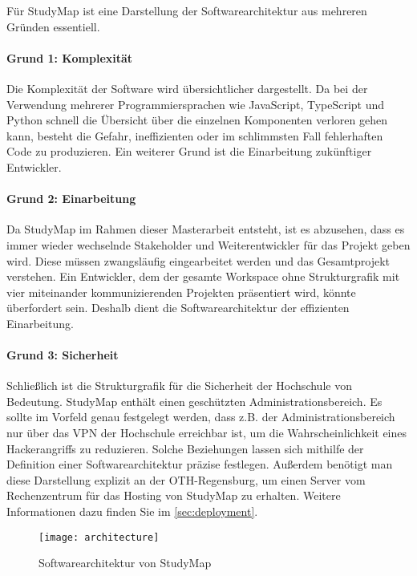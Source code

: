 Für StudyMap ist eine Darstellung der Softwarearchitektur aus mehreren Gründen essentiell.

\paragraph*{Grund 1: Komplexität}
Die Komplexität der Software wird übersichtlicher dargestellt. Da bei der Verwendung mehrerer Programmiersprachen wie JavaScript, TypeScript und Python schnell die Übersicht über die einzelnen Komponenten verloren gehen kann, besteht die Gefahr, ineffizienten oder im schlimmsten Fall fehlerhaften Code zu produzieren. Ein weiterer Grund ist die Einarbeitung zukünftiger Entwickler.

\paragraph*{Grund 2: Einarbeitung}
Da StudyMap im Rahmen dieser Masterarbeit entsteht, ist es abzusehen, dass es immer wieder wechselnde Stakeholder und Weiterentwickler für das Projekt geben wird. Diese müssen zwangsläufig eingearbeitet werden und das Gesamtprojekt verstehen. Ein Entwickler, dem der gesamte Workspace ohne Strukturgrafik mit vier miteinander kommunizierenden Projekten präsentiert wird, könnte überfordert sein. Deshalb dient die Softwarearchitektur der effizienten Einarbeitung.

\paragraph*{Grund 3: Sicherheit}
Schließlich ist die Strukturgrafik für die Sicherheit der Hochschule von Bedeutung. StudyMap enthält einen geschützten Administrationsbereich. Es sollte im Vorfeld genau festgelegt werden, dass z.B. der Administrationsbereich nur über das VPN der Hochschule erreichbar ist, um die Wahrscheinlichkeit eines Hackerangriffs zu reduzieren. Solche Beziehungen lassen sich mithilfe der Definition einer Softwarearchitektur präzise festlegen. Außerdem benötigt man diese Darstellung explizit an der OTH-Regensburg, um einen Server vom Rechenzentrum für das Hosting von StudyMap zu erhalten. Weitere Informationen dazu finden Sie im \autoref{sec:deployment}.

\begin{figure}[H]
    \centering
    \texttt{[image: architecture]}
    \caption{Softwarearchitektur von StudyMap}
    \label{fig:studymap-architecture}
\end{figure}

